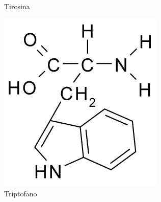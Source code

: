 \documentclass[a4paper,12pt]{article}
\begin{document}
\begin{figure}[H]
\begin{center}
\begin{minipage}{0.3\linewidth}
				\caption{Tirosina}
				\label{fig:tyrosine}
			\end{minipage}
			\begin{minipage}{0.3\linewidth}
				\centering   
				\includegraphics[width=0.7\linewidth]{tryptophan.png}
				\caption{Triptofano}
				\label{fig:tryptophan}
			\end{minipage}
		\end{center}
	\end{figure}
 	
\end{document}
